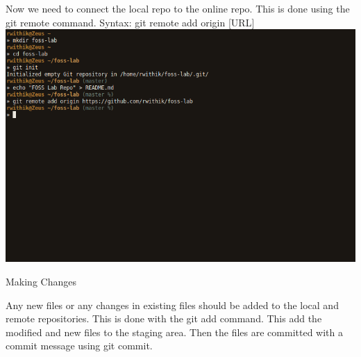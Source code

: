 \documentclass[10pt,a4paper,titlepage]{report}
\begin{document}
\par Now we need to connect the local repo to the  online repo. This is done using the {\color{red} git remote} command. \newline
Syntax: git remote add origin [URL] \newline\newline
\includegraphics[scale=.5]{../Images/VCS/2.png}
\begin{center}
\Large{Making Changes}
\end{center}
\vspace{.5cm}
\par Any new files or any changes in existing files should be added to the local and remote repositories. This is done with the {\color{red} git add} command. This add the modified and new files to the staging area. Then the files are committed with a commit message using {\color{red} git commit}. 
\end{document}
